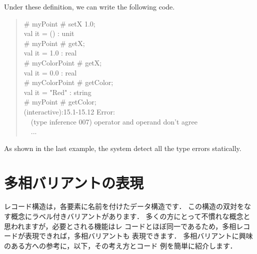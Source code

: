 \documentclass{jbook}
\newif\ifjp
\newcommand{\txt}[2]{#1}
\newcommand{\myem}{\mbox{\ \ }}
\begin{document}
	Under these definition, we can write the following code.
\begin{tt}\begin{quote}
\# myPoint \# setX 1.0;\\
val it = () : unit\\
\# myPoint \# getX;\\
val it = 1.0 : real\\
\# myColorPoint \# getX;\\
val it = 0.0 : real\\
\# myColorPoint \# getColor;\\
val it = "Red" : string\\
\# myPoint \# getColor;\\
(interactive):15.1-15.12 Error:\\
\myem  (type inference 007) operator and operand don't agree\\
\myem ...
\end{quote}\end{tt}
	As shown in the last example, the system detect all the type
errors statically.
\fi%

\section{\txt{多相バリアントの表現}{Polymorphic variants}}
\label{sec:extensionVariant}

\ifjp%
	レコード構造は，各要素に名前を付けたデータ構造です．
	この構造の双対をなす概念にラベル付きバリアントがあります．
	多くの方にとって不慣れな概念と思われますが，必要とされる機能はレ
コードとほぼ同一であるため，多相レコードが表現できれば，多相バリアントも
表現できます．
	多相バリアントに興味のある方への参考に，以下，その考え方とコード
例を簡単に紹介します．
\end{document}
